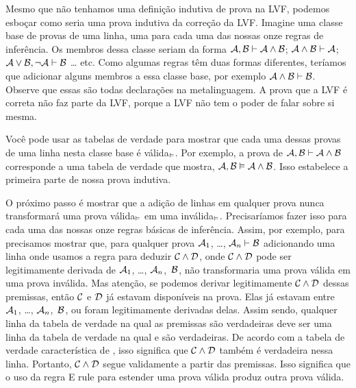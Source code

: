  Mesmo que n\~ao tenhamos uma defini\c c\~ao indutiva de prova na LVF, podemos esbo\c car como seria uma prova indutiva da corre\c c\~ao da LVF. Imagine uma classe base de provas de uma linha, uma para cada uma das nossas onze regras de infer\^encia. Os membros dessa classe seriam da forma $\mathcal{A}, \mathcal{B} \vdash  \mathcal{A} \wedge \mathcal{B}$; $\mathcal{A} \wedge \mathcal{B} \vdash \mathcal{A}$; $\mathcal{A} \vee \mathcal{B}, \neg\mathcal{A} \vdash  \mathcal{B}$ \ldots{} etc. Como algumas regras t\^em duas formas diferentes, ter\'iamos que adicionar alguns membros a essa classe base, por exemplo $\mathcal{A} \wedge \mathcal{B} \vdash  \mathcal{B}$.  Observe que essas s\~ao todas declara\c c\~oes na metalinguagem. A prova  que a LVF \'e correta n\~ao faz parte da LVF, porque a LVF n\~ao tem o poder de falar sobre si mesma.

Voc\^e pode usar as tabelas de verdade para mostrar que cada uma dessas provas de uma linha  nesta classe base \'e v\'alida$_{\vDash}$. Por exemplo, a prova de $\mathcal{A}, \mathcal{B} \vdash \mathcal{A} \wedge \mathcal{B}$ corresponde a uma tabela de verdade que mostra, $\mathcal{A}, \mathcal{B} \vDash  \mathcal{A} \wedge \mathcal{B}$. Isso estabelece a primeira parte de nossa prova indutiva.  

O pr\'oximo passo \'e mostrar que a adi\c c\~ao de linhas em qualquer prova nunca transformar\'a uma prova v\'alida$_{\vDash}$ em uma inv\'alida$_{\vDash}$. Precisar\'iamos fazer isso para cada uma das nossas onze regras b\'asicas de infer\^encia. Assim, por exemplo, para   precisamos mostrar que, para qualquer prova $\mathcal{A}_{1}$, \dots, $\mathcal{A}_{n} \vdash  \mathcal{B}$ adicionando uma linha onde usamos a  regra  para deduzir $\mathcal{C} \wedge \mathcal{D}$, onde $\mathcal{C} \wedge \mathcal{D}$ pode ser legitimamente derivada de $\mathcal{A}_{1}$, \dots, $\mathcal{A}_{n}$,~$\mathcal{B}$,  n\~ao transformaria uma prova v\'alida em uma prova inv\'alida. Mas aten\c c\~ao, se podemos derivar legitimamente $\mathcal{C} \wedge \mathcal{D}$ dessas premissas, ent\~ao $\mathcal{C}$ e $\mathcal{D}$  j\'a estavam dispon\'iveis na prova. Elas j\'a estavam entre $\mathcal{A}_{1}$, \dots, $\mathcal{A}_{n}$,~$\mathcal{B}$, ou foram legitimamente derivadas delas.  Assim sendo, qualquer linha da tabela  de verdade na qual as premissas s\~ao verdadeiras deve ser uma linha da tabela de verdade na qual  e  s\~ao verdadeiras. De acordo com a tabela de verdade caracter\'istica de \eand, isso significa que $\mathcal{C} \wedge \mathcal{D}$ tamb\'em \'e verdadeira nessa linha. Portanto,  $\mathcal{C} \wedge \mathcal{D}$ segue validamente a partir das premissas. Isso significa que o uso da regra {\eand}E rule para estender uma prova v\'alida produz outra prova v\'alida.


